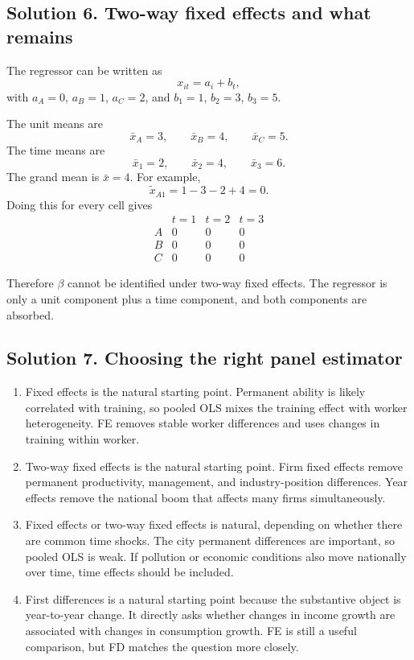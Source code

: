 \documentclass[11pt]{article}
\begin{document}
\subsection*{Solution 6. Two-way fixed effects and what remains}

\begin{solutionbox}
The regressor can be written as
\[
x_{it}=a_i+b_t,
\]
with $a_A=0$, $a_B=1$, $a_C=2$, and $b_1=1$, $b_2=3$, $b_3=5$.

The unit means are
\[
\bar{x}_A=3,\qquad \bar{x}_B=4,\qquad \bar{x}_C=5.
\]
The time means are
\[
\bar{x}_1=2,\qquad \bar{x}_2=4,\qquad \bar{x}_3=6.
\]
The grand mean is $\bar{x}=4$. For example,
\[
\tilde{x}_{A1}=1-3-2+4=0.
\]
Doing this for every cell gives
\[
\begin{array}{c|ccc}
&t=1&t=2&t=3\\
\hline
A&0&0&0\\
B&0&0&0\\
C&0&0&0
\end{array}
\]

Therefore $\beta$ cannot be identified under two-way fixed effects. The regressor is only a unit component plus a time component, and both components are absorbed.
\end{solutionbox}

\subsection*{Solution 7. Choosing the right panel estimator}

\begin{solutionbox}
\begin{enumerate}[label=(\alph*)]
\item Fixed effects is the natural starting point. Permanent ability is likely correlated with training, so pooled OLS mixes the training effect with worker heterogeneity. FE removes stable worker differences and uses changes in training within worker.

\item Two-way fixed effects is the natural starting point. Firm fixed effects remove permanent productivity, management, and industry-position differences. Year effects remove the national boom that affects many firms simultaneously.

\item Fixed effects or two-way fixed effects is natural, depending on whether there are common time shocks. The city permanent differences are important, so pooled OLS is weak. If pollution or economic conditions also move nationally over time, time effects should be included.

\item First differences is a natural starting point because the substantive object is year-to-year change. It directly asks whether changes in income growth are associated with changes in consumption growth. FE is still a useful comparison, but FD matches the question more closely.
\end{enumerate}
\end{solutionbox}
\end{document}
